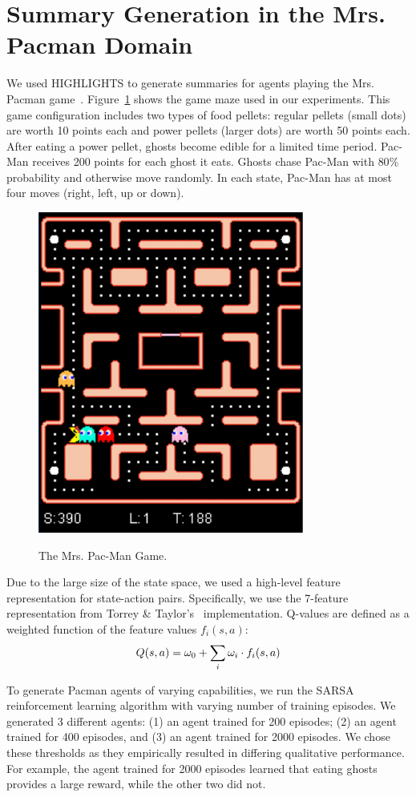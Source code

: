 \section{Summary Generation in the Mrs. Pacman Domain}
\label{sec:pacman}
We used HIGHLIGHTS to generate summaries for agents playing the Mrs. Pacman game~\cite{rohlfshagen2011ms}. Figure~\ref{fig:pacman} shows the game maze used in our experiments. This game configuration includes two types of food pellets: regular pellets (small dots) are worth 10 points each and power pellets (larger dots) are worth 50 points each. After eating a power pellet, ghosts become edible for a limited time period. Pac-Man receives 200 points for each ghost it eats. Ghosts chase Pac-Man with $80\%$ probability and otherwise move randomly. In each state, Pac-Man has at most four moves (right, left, up or down). 

\begin{figure}
	\centering
	\includegraphics[width=0.4\columnwidth]{figs/pacman1.pdf}\\
	\caption{The Mrs. Pac-Man Game.}
	\label{fig:pacman}
	\vspace{-0.4cm}
\end{figure}

Due to the large size of the state space, we used a high-level feature representation for state-action pairs. Specifically, we use the 7-feature representation from Torrey \& Taylor's~ implementation. Q-values are defined as a weighted function of the feature values $ f_{i}(s,a)$:
\begin{equation}
Q(s,a)=\omega_{0}+\sum_{i}{\omega_{i} \cdot f_{i}(s,a)}
\label{e:q}
\vspace{-0.3cm}
\end{equation}

To generate Pacman agents of varying capabilities, we run the SARSA reinforcement learning algorithm with varying number of training episodes. We generated 3 different agents: (1) an agent trained for 200 episodes; (2) an agent trained for 400 episodes, and (3) an agent trained for 2000 episodes. We chose these thresholds as they empirically resulted in differing qualitative performance. For example, the agent trained for 2000 episodes learned that eating ghosts provides a large reward, while the other two did not. 